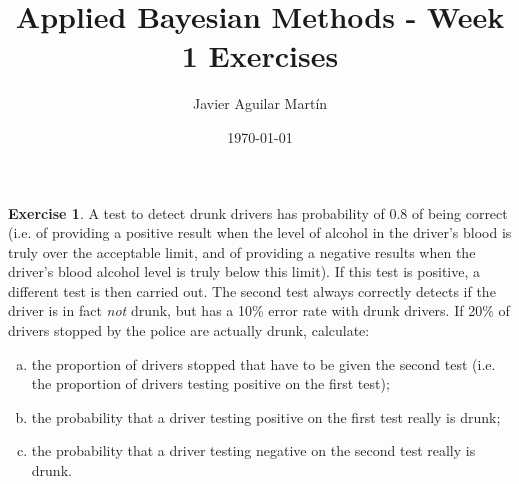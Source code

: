 \documentclass{article}
\theoremstyle{plain}
\theoremstyle{definition}
\newtheorem{exercise}{Exercise}
\begin{document}
\title{Applied Bayesian Methods - Week 1 Exercises }
\author{Javier Aguilar Martín}
\date{\today}
\maketitle
\begin{exercise}
A test to detect drunk drivers has probability of 0.8 of being correct
(i.e. of providing a positive result when the level of alcohol in the
driver's blood is truly over the acceptable limit, and of providing a
negative results when the driver's blood alcohol level is truly below
this limit). If this test is positive, a different test is then carried out.
The second test always correctly detects if the driver is in fact \emph{not}
drunk, but has a 10\% error rate with drunk drivers.
If 20\% of drivers stopped by the police are actually drunk, calculate:

\begin{enumerate}[(a)]
\item the proportion of drivers stopped that have to be given the second
test (i.e. the proportion of drivers testing positive on the first test);
\item the probability that a driver testing positive on the first test really
is drunk;
\item the probability that a driver testing negative on the second test
really is drunk.
\end{enumerate}

\end{exercise}
\end{document}
